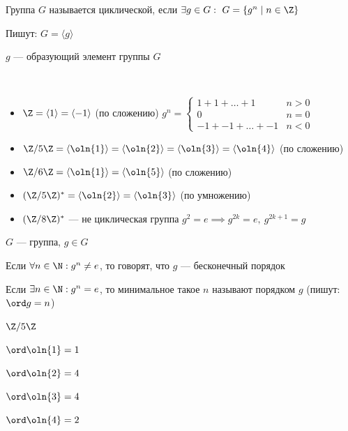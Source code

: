 \begin{defn}
    Группа $G$ называется циклической, если $\exists g \in G :\ G = \{g^n \mid n \in \Z\}$

    Пишут: $G = \langle g \rangle$
\end{defn}

\begin{defn}
    $g$ --- образующий элемент группы $G$
\end{defn}

\begin{examples}~
    
    \begin{itemize}
        \item $\Z = \langle 1 \rangle = \langle -1 \rangle$ (по сложению) $g^n = \begin{cases}
            1 + 1 + \ldots + 1 & n > 0 \\
            0 & n = 0 \\
            -1 + -1 + \ldots + -1 & n < 0
        \end{cases}$

        \item $\Z/5\Z = \langle \oln{1} \rangle = \langle \oln{2} \rangle = \langle \oln{3} \rangle = \langle \oln{4} \rangle$ (по сложению)
        
        \item $\Z/6\Z = \langle \oln{1} \rangle = \langle \oln{5} \rangle$ (по сложению)
        
        \item $(\Z/5\Z)^* = \langle \oln{2} \rangle = \langle \oln{3} \rangle$ (по умножению)
        
        \item $(\Z/8\Z)^*$ --- не циклическая группа $g^2 = e \implies g^{2k} = e,~g^{2k+1} = g$
    \end{itemize}
\end{examples}

\begin{defn}
    $G$ --- группа, $g \in G$

    Если $\forall n \in \N: g^n \neq e$, то говорят, что $g$ --- бесконечный порядок

    Если $\exists n \in \N: g^n = e$, то минимальное такое $n$ называют порядком $g$ (пишут: $\ord g = n$)
\end{defn}

\begin{example}
    $\Z/5\Z$

    $\ord \oln{1} = 1$

    $\ord \oln{2} = 4$
    
    $\ord \oln{3} = 4$
    
    $\ord \oln{4} = 2$
\end{example}

